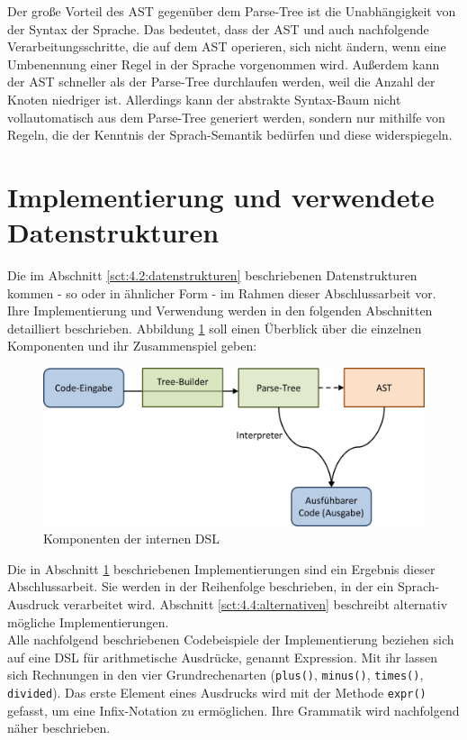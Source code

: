 Der große Vorteil des AST gegenüber dem Parse-Tree ist die Unabhängigkeit von der Syntax der Sprache. Das bedeutet, dass der AST und auch  nachfolgende Verarbeitungsschritte, die auf dem AST operieren, sich nicht ändern, wenn eine Umbenennung einer Regel in der Sprache vorgenommen wird. Außerdem kann der AST schneller als der Parse-Tree durchlaufen werden, weil die Anzahl der Knoten niedriger ist. Allerdings kann der abstrakte Syntax-Baum nicht vollautomatisch aus dem Parse-Tree generiert werden, sondern nur mithilfe von Regeln, die der Kenntnis der Sprach-Semantik bedürfen und diese widerspiegeln.

\section{Implementierung und verwendete Datenstrukturen}\label{sct:4.3:implementierung}
Die im Abschnitt \ref{sct:4.2:datenstrukturen} beschriebenen Datenstrukturen kommen - so oder in ähnlicher Form - im Rahmen dieser Abschlussarbeit vor. Ihre Implementierung und Verwendung werden in den folgenden Abschnitten detailliert beschrieben. Abbildung \ref{fig:komponenten} soll einen Überblick über die einzelnen Komponenten und ihr Zusammenspiel geben:

\begin{figure}[H]
\centering\includegraphics[width=.8\textwidth]{images/kapitel4/komponenten.png}
\caption{Komponenten der internen DSL}
\label{fig:komponenten}
\end{figure}

Die in Abschnitt \ref{sct:4.3:implementierung} beschriebenen Implementierungen sind ein Ergebnis dieser Abschlussarbeit. Sie werden in der Reihenfolge beschrieben, in der ein Sprach-Ausdruck verarbeitet wird. Abschnitt \ref{sct:4.4:alternativen} beschreibt alternativ mögliche Implementierungen.\\
Alle nachfolgend beschriebenen Codebeispiele der Implementierung beziehen sich auf eine DSL für arithmetische Ausdrücke, genannt \glqq Expression\grqq. Mit ihr lassen sich Rechnungen in den vier Grundrechenarten (\texttt{plus()}, \texttt{minus()}, \texttt{times()}, \texttt{divided}). Das erste Element eines Ausdrucks wird mit der Methode \texttt{expr()} gefasst, um eine Infix-Notation zu ermöglichen. Ihre Grammatik wird nachfolgend näher beschrieben.

